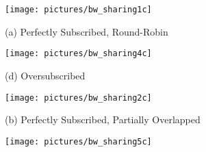 \documentclass[conference]{IEEEtran}
\theoremstyle{plain}
\theoremstyle{definition}
\theoremstyle{plain}
\theoremstyle{plain}
\begin{document}
\begin{figure*}
\begin{centering}
\begin{minipage}[t]{1\columnwidth}\begin{flushleft}
\texttt{[image: pictures/bw\_sharing1c]} 
\par\end{flushleft}

\begin{flushleft}
\vspace{-0.1in}
\small\hspace{0.8in}(a) Perfectly Subscribed, Round-Robin\vspace{0.05in}

\par\end{flushleft}\end{minipage}\begin{minipage}[t]{1\columnwidth}\begin{flushleft}
\texttt{[image: pictures/bw\_sharing4c]} 
\par\end{flushleft}

\begin{flushleft}
\vspace{-0.1in}
\small\hspace{1.2in}(d) Oversubscribed
\par\end{flushleft}\end{minipage} \begin{minipage}[t]{1\columnwidth}\begin{flushleft}
\texttt{[image: pictures/bw\_sharing2c]} 
\par\end{flushleft}

\begin{flushleft}
\vspace{-0.1in}
\small\hspace{0.8in}(b) Perfectly Subscribed, Partially Overlapped
\vspace{0.05in}

\par\end{flushleft}\end{minipage}\begin{minipage}[t]{1\columnwidth}\begin{flushleft}
\texttt{[image: pictures/bw\_sharing5c]} 
\par\end{flushleft}


\end{minipage}
\end{centering}
\end{figure*}
\end{document}
